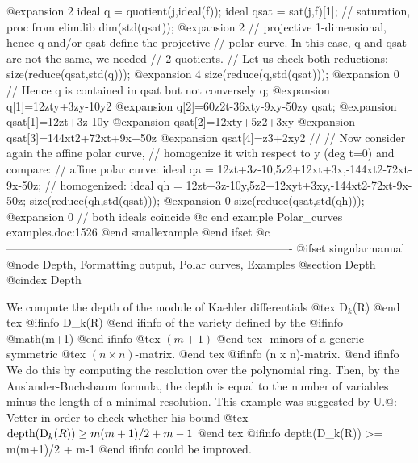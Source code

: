 @expansion{} 2
  ideal q = quotient(j,ideal(f));
  ideal qsat = sat(j,f)[1];           // saturation, proc from elim.lib
  dim(std(qsat));
@expansion{} 2
  // projective 1-dimensional, hence q and/or qsat define the projective
  // polar curve. In this case, q and qsat are not the same, we needed
  // 2 quotients.
  // Let us check both reductions:
  size(reduce(qsat,std(q)));
@expansion{} 4
  size(reduce(q,std(qsat)));
@expansion{} 0
  // Hence q is contained in qsat but not conversely
  q;
@expansion{} q[1]=12zty+3zy-10y2
@expansion{} q[2]=60z2t-36xty-9xy-50zy
  qsat;
@expansion{} qsat[1]=12zt+3z-10y
@expansion{} qsat[2]=12xty+5z2+3xy
@expansion{} qsat[3]=144xt2+72xt+9x+50z
@expansion{} qsat[4]=z3+2xy2
  //
  // Now consider again the affine polar curve,
  // homogenize it with respect to y (deg t=0) and compare:
  // affine polar curve:
  ideal qa = 12zt+3z-10,5z2+12xt+3x,-144xt2-72xt-9x-50z;
  // homogenized:
  ideal qh = 12zt+3z-10y,5z2+12xyt+3xy,-144xt2-72xt-9x-50z;
  size(reduce(qh,std(qsat)));
@expansion{} 0
  size(reduce(qsat,std(qh)));
@expansion{} 0
  // both ideals coincide
@c end example Polar_curves examples.doc:1526
@end smallexample
@end ifset
@c ----------------------------------------------------------------------------
@ifset singularmanual
@node Depth, Formatting output, Polar curves, Examples
@section Depth
@cindex Depth

We compute the depth of the module of Kaehler differentials
@tex
D$_k$(R)
@end tex
@ifinfo
D_k(R)
@end ifinfo
of the variety defined by the 
@ifinfo
@math{(m+1)}
@end ifinfo
@tex
$(m+1)$
@end tex
-minors of a generic symmetric
@tex
$(n \times n)$-matrix.
@end tex
@ifinfo
(n x n)-matrix.
@end ifinfo
We do this by computing the resolution over the polynomial
ring.  Then, by the Auslander-Buchsbaum formula, the depth is equal to
the number of variables minus the length of a minimal resolution.  This
example was suggested by U.@: Vetter in order to check whether his bound
@tex
$\hbox{depth}(\hbox{D}_k(R))\geq m(m+1)/2 + m-1$
@end tex
@ifinfo
depth(D_k(R)) >= m(m+1)/2 + m-1
@end ifinfo
could be improved.

